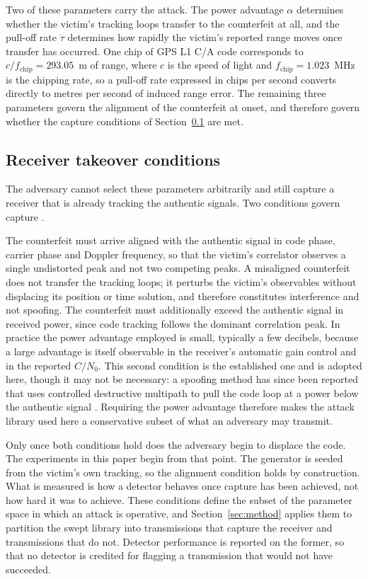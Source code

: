 \documentclass[pdflatex,sn-basic]{sn-jnl}
\theoremstyle{thmstyleone}
\theoremstyle{thmstyletwo}
\theoremstyle{thmstylethree}
\begin{document}
Two of these parameters carry the attack. The power advantage $\alpha$ determines whether
the victim's tracking loops transfer to the counterfeit at all, and the pull-off rate
$\dot\tau$ determines how rapidly the victim's reported range moves once transfer has
occurred. One chip of GPS L1 C/A code corresponds to
$c/f_\mathrm{chip} = 293.05$~m of range, where $c$ is the speed of light and
$f_\mathrm{chip} = 1.023$~MHz is the chipping rate, so a pull-off rate expressed in chips
per second converts directly to metres per second of induced range error. The remaining
three parameters govern the alignment of the counterfeit at onset, and therefore govern
whether the capture conditions of Section~\ref{sec:takeover} are met.

\subsection{Receiver takeover conditions}
\label{sec:takeover}

The adversary cannot select these parameters arbitrarily and still capture a receiver that
is already tracking the authentic signals. Two conditions govern capture
\citep{psiaki2016gnss,kerns2014uav}.

The counterfeit must arrive aligned with the authentic signal in code phase, carrier phase
and Doppler frequency, so that the victim's correlator observes a single undistorted peak
and not two competing peaks. A misaligned counterfeit does not transfer the tracking
loops; it perturbs the victim's observables without displacing its position or time
solution, and therefore constitutes interference and not spoofing. The counterfeit must
additionally exceed the authentic signal in received power, since code tracking follows the
dominant correlation peak. In practice the power advantage employed is small, typically a
few decibels, because a large advantage is itself observable in the receiver's automatic
gain control and in the reported $C/N_0$. This second condition is the established one
and is adopted here, though it may not be necessary: a spoofing method has since been
reported that uses controlled destructive multipath to pull the code loop at a power
below the authentic signal \citep{liu2026dimas}. Requiring the power advantage therefore
makes the attack library used here a conservative subset of what an adversary may
transmit.

Only once both conditions hold does the adversary begin to displace the code. The
experiments in this paper begin from that point. The generator is seeded from the victim's
own tracking, so the alignment condition holds by construction. What is measured is how a
detector behaves once capture has been achieved, not how hard it was to achieve. These
conditions define the subset of the parameter space in which an attack is operative, and
Section~\ref{sec:method} applies them to partition the swept library into transmissions
that capture the receiver and transmissions that do not. Detector performance is reported
on the former, so that no detector is credited for flagging a transmission that would not
have succeeded.
\end{document}
